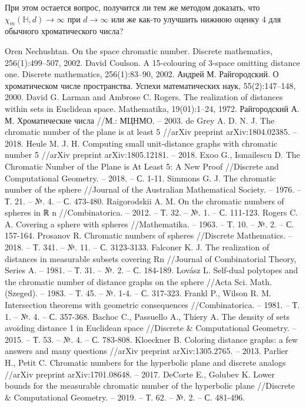 \documentclass[a4paper,12pt]{article}
\begin{document}
При этом остается вопрос, получится ли тем же методом доказать, что $\chi_m(\mathbb{H},d) \rightarrow \infty$ при $d \rightarrow \infty$ или же как-то улучшить нижнюю оценку $4$ для обычного хроматического числа?
 
  \begin{thebibliography}{99}
Oren Nechushtan. On the space chromatic number. Discrete mathematics, 256(1):499–507, 2002.
 David Coulson. A 15-colouring of 3-space omitting distance one. Discrete mathematics, 256(1):83–90, 2002.
 Андрей М. Райгородский. О хроматическом числе пространства. Успехи математических наук, 55(2):147–148, 2000.
  David G. Larman and Ambrose C. Rogers. The realization of distances within sets in Euclidean space. Mathematika, 19(01):1–24, 1972. 
Райгородский А. М. Хроматические числа //М.: МЦНМО. – 2003.
de Grey A. D. N. J. The chromatic number of the plane is at least 5 //arXiv preprint arXiv:1804.02385. – 2018.
Heule M. J. H. Computing small unit-distance graphs with chromatic number 5 //arXiv preprint arXiv:1805.12181. – 2018.
Exoo G., Ismailescu D. The Chromatic Number of the Plane is At Least 5: A New Proof //Discrete and Computational Geometry. – 2018. – С. 1-11.
Simmons G. J. The chromatic number of the sphere //Journal of the Australian Mathematical Society. – 1976. – Т. 21. – №. 4. – С. 473-480.
Raigorodskii A. M. On the chromatic numbers of spheres in ℝ n //Combinatorica. – 2012. – Т. 32. – №. 1. – С. 111-123.
Rogers C. A. Covering a sphere with spheres //Mathematika. – 1963. – Т. 10. – №. 2. – С. 157-164.
Prosanov R. Chromatic numbers of spheres //Discrete Mathematics. – 2018. – Т. 341. – №. 11. – С. 3123-3133.
Falconer K. J. The realization of distances in measurable subsets covering Rn //Journal of Combinatorial Theory, Series A. – 1981. – Т. 31. – №. 2. – С. 184-189.
Lovász L. Self-dual polytopes and the chromatic number of distance graphs on the sphere //Acta Sci. Math.(Szeged). – 1983. – Т. 45. – №. 1-4. – С. 317-323.
Frankl P., Wilson R. M. Intersection theorems with geometric consequences //Combinatorica. – 1981. – Т. 1. – №. 4. – С. 357-368.
Bachoc C., Passuello A., Thiery A. The density of sets avoiding distance 1 in Euclidean space //Discrete & Computational Geometry. – 2015. – Т. 53. – №. 4. – С. 783-808.
Kloeckner B. Coloring distance graphs: a few answers and many questions //arXiv preprint arXiv:1305.2765. – 2013.
Parlier H., Petit C. Chromatic numbers for the hyperbolic plane and discrete analogs //arXiv preprint arXiv:1701.08648. – 2017.
DeCorte E., Golubev K. Lower bounds for the measurable chromatic number of the hyperbolic plane //Discrete & Computational Geometry. – 2019. – Т. 62. – №. 2. – С. 481-496.
\end{thebibliography}
\end{document}
